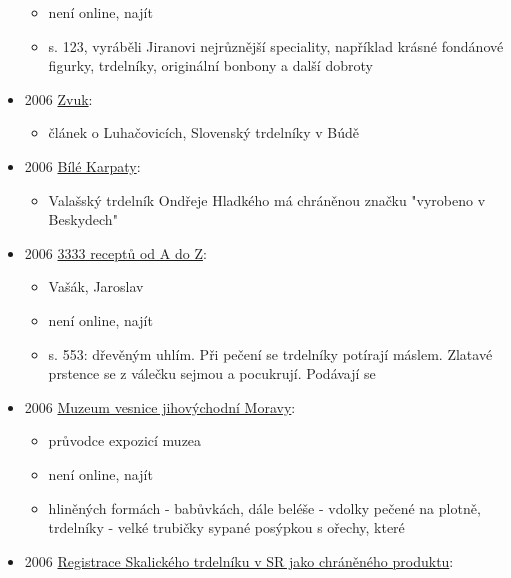 \begin{itemize}
  \begin{itemize}
  \tightlist
  \item
    není online, najít
  \item
    s. 123, vyráběli Jiranovi nejrůznější speciality, například krásné
    fondánové figurky, trdelníky, originální bonbony a další dobroty
  \end{itemize}
\item
  2006
  \href{https://ceskadigitalniknihovna.cz/uuid/uuid:d3bddf00-5ca4-11eb-a728-5ef3fc9bb22f}{Zvuk}:

  \begin{itemize}
  \tightlist
  \item
    článek o Luhačovicích, Slovenský trdelníky v Búdě
  \end{itemize}
\item
  2006
  \href{https://ceskadigitalniknihovna.cz/uuid/uuid:1b16fb51-6afc-11e2-b4a8-001018b5eb5c}{Bílé
  Karpaty}:

  \begin{itemize}
  \tightlist
  \item
    Valašský trdelník Ondřeje Hladkého má chráněnou značku "vyrobeno v
    Beskydech"
  \end{itemize}
\item
  2006
  \href{https://ceskadigitalniknihovna.cz/uuid/uuid:616f5dc0-6adb-11e7-b92d-005056827e51}{3333
  receptů od A do Z}:

  \begin{itemize}
  \tightlist
  \item
    Vašák, Jaroslav
  \item
    není online, najít
  \item
    s. 553: dřevěným uhlím. Při pečení se trdelníky potírají máslem.
    Zlatavé prstence se z válečku sejmou a pocukrují. Podávají se
  \end{itemize}
\item
  2006
  \href{https://ceskadigitalniknihovna.cz/uuid/uuid:a7380140-967b-11e9-9209-005056827e51}{Muzeum
  vesnice jihovýchodní Moravy}:

  \begin{itemize}
  \tightlist
  \item
    průvodce expozicí muzea
  \item
    není online, najít
  \item
    hliněných formách - babůvkách, dále beléše - vdolky pečené na
    plotně, trdelníky - velké trubičky sypané posýpkou s ořechy, které
  \end{itemize}
\item
  2006
  \href{https://www.indprop.gov.sk/swift_data/source/pdf/specifikacie_op_oz/skalicky_trdelnik.pdf}{Registrace
  Skalického trdelníku v SR jako chráněného produktu}:


\end{itemize}
